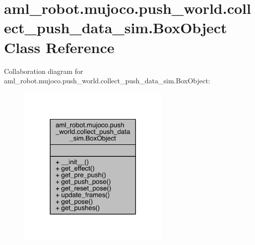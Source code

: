 \hypertarget{classaml__robot_1_1mujoco_1_1push__world_1_1collect__push__data__sim_1_1_box_object}{}\section{aml\+\_\+robot.\+mujoco.\+push\+\_\+world.\+collect\+\_\+push\+\_\+data\+\_\+sim.\+Box\+Object Class Reference}
\label{classaml__robot_1_1mujoco_1_1push__world_1_1collect__push__data__sim_1_1_box_object}


Collaboration diagram for aml\+\_\+robot.\+mujoco.\+push\+\_\+world.\+collect\+\_\+push\+\_\+data\+\_\+sim.\+Box\+Object\+:\nopagebreak
\begin{figure}[H]
\begin{center}
\leavevmode
\includegraphics[width=209pt]{classaml__robot_1_1mujoco_1_1push__world_1_1collect__push__data__sim_1_1_box_object__coll__graph}
\end{center}
\end{figure}
